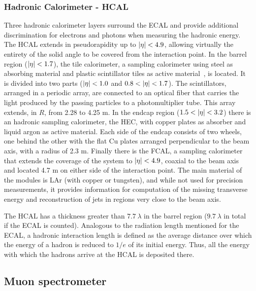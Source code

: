 \subsubsection{Hadronic Calorimeter - HCAL}



Three hadronic calorimeter layers surround the \ac{ECAL} and provide additional discrimination for electrons and photons when measuring the hadronic energy. The \ac{HCAL} extends in pseudorapidity up to \(|\eta|<4.9\), allowing virtually the entirety of the solid angle to be covered from the interaction point. In the barrel region (\(|\eta|<1.7\)), the tile calorimeter, a sampling calorimeter using steel as absorbing material and plastic scintillator tiles as active material~\cite{ATLAS-Tile-TDR}, is located. It is divided into two parts (\(|\eta|<1.0\) and \(0.8<\abseta<1.7\)). The scintillators, arranged in a periodic array, are connected to an optical fiber that carries the light produced by the passing particles to a photomultiplier tube. This array extends, in \(R\), from 2.28 to 4.25 m. In the endcap region (\(1.5<\abseta<3.2\)) there is an hadronic sampling calorimeter, the \ac{HEC}, with copper plates as absorber and liquid argon as active material. Each side of the endcap consists of two wheels, one behind the other with the flat Cu plates arranged perpendicular to the beam axis, with a radius of 2.3 m. Finally there is the \ac{FCAL}, a sampling calorimeter that extends the coverage of the system to \(|\eta|<4.9\), coaxial to the beam axis and located 4.7 m on either side of the interaction point. The main material of the modules is \ac{LAr} (with copper or tungsten), and while not used for precision measurements, it provides information for computation of the missing transverse energy and reconstruction of jets in regions very close to the beam axis.

The \ac{HCAL} has a thickness greater than \(7.7~\lambda\) in the barrel region (\(9.7~\lambda\) in total if the \ac{ECAL} is counted). Analogous to the radiation length mentioned for the \ac{ECAL}, a hadronic interaction length is defined as the average distance over which the energy of a hadron is reduced to \(1/e\) of its initial energy. Thus, all the energy with which the hadrons arrive at the \ac{HCAL} is deposited there.





\subsection{Muon spectrometer}

